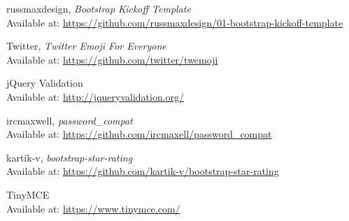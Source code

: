 \documentclass[11pt,letterpaper,titlepage]{article}
\begin{document}
    \newpage
    \begin{thebibliography}{9}

          russmaxdesign,
          \emph{Bootstrap Kickoff Template}\\
          Available at:
          \href{https://github.com/russmaxdesign/01-bootstrap-kickoff-template}
               {https://github.com/russmaxdesign/01-bootstrap-kickoff-template}

        Twitter,
        \emph{Twitter Emoji For Everyone}\\
        Available at: \href{https://github.com/twitter/twemoji}
                        {https://github.com/twitter/twemoji}

        jQuery Validation\\
        Available at: \href{http://jqueryvalidation.org/}
                           {http://jqueryvalidation.org/}

        ircmaxwell,
        \emph{password\_compat}\\
        Available at: \href{https://github.com/ircmaxell/password_compat}
                           {https://github.com/ircmaxell/password\_compat}

       kartik-v,
       \emph{bootstrap-star-rating}\\
       Available at: \href{https://github.com/kartik-v/bootstrap-star-rating}
                          {https://github.com/kartik-v/bootstrap-star-rating}

       TinyMCE\\
       Available at: \href{https://www.tinymce.com/}
                          {https://www.tinymce.com/}

    \end{thebibliography}
\end{document}

